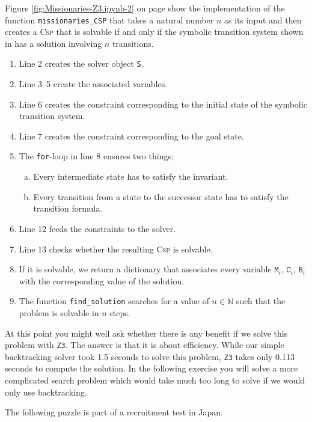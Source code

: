 Figure \ref{fig:Missionaries-Z3.ipynb-2} on page \pageref{fig:Missionaries-Z3.ipynb-2} show the implementation
of the function \texttt{missionaries\_CSP} that takes a natural number $n$ as its input and then creates a
\textsc{Csp} that is solvable if and only if the symbolic transition system shown in
 has a solution involving $n$ transitions.
\begin{enumerate}
\item Line 2 creates the solver object \texttt{S}.
\item Line 3--5 create the associated variables.
\item Line 6 creates the constraint corresponding to the initial state of the symbolic transition system.
\item Line 7 creates the constraint corresponding to the goal state.
\item The \texttt{for}-loop in line 8 ensures two things:
  \begin{enumerate}[(a)]
  \item Every intermediate state has to satisfy the invariant.
  \item Every transition from a state to the successor state has to satisfy the transition formula.
  \end{enumerate}
\item Line 12 feeds the constraints to the solver.
\item Line 13 checks whether the resulting \textsc{Csp} is solvable.
\item If it is solvable, we return a dictionary that associates every variable $\texttt{M}_i$,  $\texttt{C}_i$,
      $\texttt{B}_i$ with the corresponding value of the solution.
\item The function \texttt{find\_solution} searches for a value of $n \in \mathbb{N}$ such that the problem is
      solvable in $n$ steps.
\end{enumerate}
At this point you might well ask whether there is any benefit if we solve this problem with \texttt{Z3}.  The
answer is that it is about efficiency.  While our simple backtracking solver took 1.5 seconds to solve this
problem, \texttt{Z3} takes only 0.113 seconds to compute the solution.  In the following exercise you will
solve a more complicated search problem which would take much too long to solve if we would only use backtracking.

\exerciseEng
The following puzzle is part of a recruitment test in Japan.

